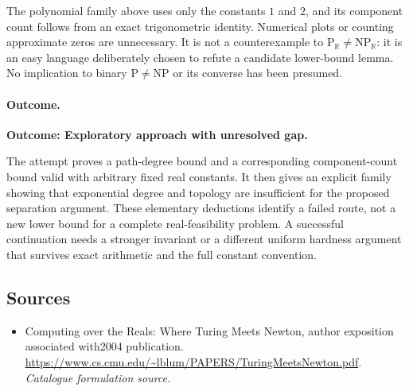 \documentclass[11pt,a4paper]{article}
\newcommand{\R}{\mathbb{R}}
\numberwithin{equation}{section}
\begin{document}
The polynomial family above uses only the constants $1$ and $2$, and its
component count follows from an exact trigonometric identity. Numerical
plots or counting approximate zeros are unnecessary. It is not a
counterexample to $\mathrm P_{\R}\ne\mathrm{NP}_{\R}$: it is an easy
language deliberately chosen to refute a candidate lower-bound lemma.
No implication to binary $\mathrm P\ne\mathrm{NP}$ or its converse has
been presumed.

\paragraph{Outcome.}
\textbf{Outcome: Exploratory approach with unresolved gap.}

The attempt proves a path-degree bound and a corresponding component-count
bound valid with arbitrary fixed real constants. It then gives an explicit
family showing that exponential degree and topology are insufficient for
the proposed separation argument. These elementary deductions identify a
failed route, not a new lower bound for a complete real-feasibility problem.
A successful continuation needs a stronger invariant or a different
uniform hardness argument that survives exact arithmetic and the full
constant convention.
\subsection{Sources}
\begin{itemize}\raggedright
\item[\textnormal{[S1]}]\hypertarget{source:172:1}{} Computing over the Reals: Where Turing Meets Newton, author exposition associated with2004 publication.
\url{https://www.cs.cmu.edu/~lblum/PAPERS/TuringMeetsNewton.pdf}.
{\small\textit{Catalogue formulation source.}}
\end{itemize}
\end{document}
